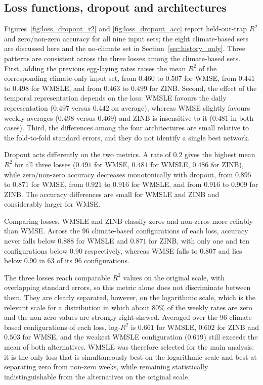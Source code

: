 \documentclass[11pt,a4paper]{article}
\begin{document}
\subsection{Loss functions, dropout and architectures}

Figures~\ref{fig:loss_dropout_r2} and \ref{fig:loss_dropout_acc} report held-out-trap $R^2$ and zero/non-zero accuracy for all nine input sets; the eight climate-based sets are discussed here and the no-climate set in Section~\ref{sec:history_only}. Three patterns are consistent across the three losses among the climate-based sets. First, adding the previous egg-laying rates raises the mean $R^2$ of the corresponding climate-only input set, from $0.460$ to $0.507$ for WMSE, from $0.441$ to $0.498$ for WMSLE, and from $0.463$ to $0.499$ for ZINB. Second, the effect of the temporal representation depends on the loss: WMSLE favours the daily representation ($0.497$ versus $0.442$ on average), whereas WMSE slightly favours weekly averages ($0.498$ versus $0.469$) and ZINB is insensitive to it ($0.481$ in both cases). Third, the differences among the four architectures are small relative to the fold-to-fold standard errors, and they do not identify a single best network.

Dropout acts differently on the two metrics. A rate of $0.2$ gives the highest mean $R^2$ for all three losses ($0.491$ for WMSE, $0.481$ for WMSLE, $0.486$ for ZINB), while zero/non-zero accuracy decreases monotonically with dropout, from $0.895$ to $0.871$ for WMSE, from $0.921$ to $0.916$ for WMSLE, and from $0.916$ to $0.909$ for ZINB. The accuracy differences are small for WMSLE and ZINB and considerably larger for WMSE.

Comparing losses, WMSLE and ZINB classify zeros and non-zeros more reliably than WMSE. Across the 96 climate-based configurations of each loss, accuracy never falls below $0.888$ for WMSLE and $0.871$ for ZINB, with only one and ten configurations below $0.90$ respectively, whereas WMSE falls to $0.807$ and lies below $0.90$ in 63 of its 96 configurations.

The three losses reach comparable $R^2$ values on the original scale, with overlapping standard errors, so this metric alone does not discriminate between them. They are clearly separated, however, on the logarithmic scale, which is the relevant scale for a distribution in which about $80\%$ of the weekly rates are zero and the non-zero values are strongly right-skewed. Averaged over the 96 climate-based configurations of each loss, log-$R^2$ is $0.661$ for WMSLE, $0.602$ for ZINB and $0.503$ for WMSE, and the weakest WMSLE configuration ($0.619$) still exceeds the mean of both alternatives. WMSLE was therefore selected for the main analysis: it is the only loss that is simultaneously best on the logarithmic scale and best at separating zero from non-zero weeks, while remaining statistically indistinguishable from the alternatives on the original scale.
\end{document}
